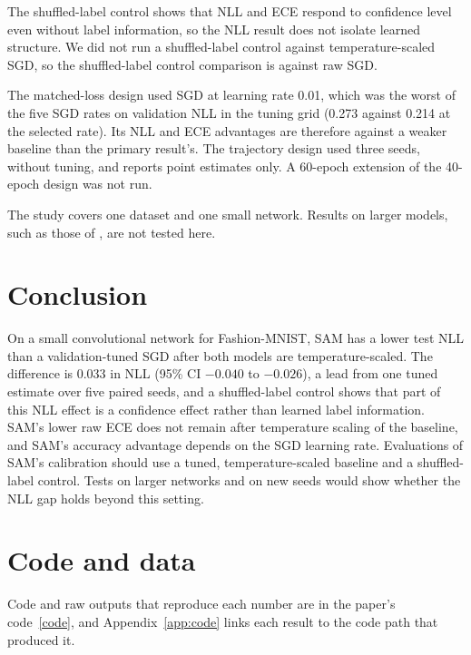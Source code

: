 \documentclass[11pt,letterpaper]{article}
\begin{document}
The shuffled-label control shows that NLL and ECE respond to confidence level even without label information, so the NLL result does not isolate learned structure. We did not run a shuffled-label control against temperature-scaled SGD, so the shuffled-label control comparison is against raw SGD.

The matched-loss design used SGD at learning rate 0.01, which was the worst of the five SGD rates on validation NLL in the tuning grid (0.273 against 0.214 at the selected rate). Its NLL and ECE advantages are therefore against a weaker baseline than the primary result's. The trajectory design used three seeds, without tuning, and reports point estimates only. A 60-epoch extension of the 40-epoch design was not run.

The study covers one dataset and one small network. Results on larger models, such as those of \citet{Tan2026}, are not tested here.

\section{Conclusion}\label{sec:conclusion}
On a small convolutional network for Fashion-MNIST, SAM has a lower test NLL than a validation-tuned SGD after both models are temperature-scaled. The difference is 0.033 in NLL (95\% CI $-0.040$ to $-0.026$), a lead from one tuned estimate over five paired seeds, and a shuffled-label control shows that part of this NLL effect is a confidence effect rather than learned label information. SAM's lower raw ECE does not remain after temperature scaling of the baseline, and SAM's accuracy advantage depends on the SGD learning rate. Evaluations of SAM's calibration should use a tuned, temperature-scaled baseline and a shuffled-label control. Tests on larger networks and on new seeds would show whether the NLL gap holds beyond this setting.

\section*{Code and data}
Code and raw outputs that reproduce each number are in the paper's code~\href{https://github.com/ai-inventor-papers/ai-invention-d46016-sharpness-aware-training-makes-small/tree/main}{[code]}, and Appendix~\ref{app:code} links each result to the code path that produced it.

\clearpage



\clearpage
\appendix
\end{document}
